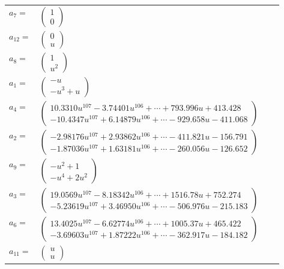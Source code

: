\documentclass[1p]{elsarticle_modified}
\theoremstyle{definition}
\begin{document}
\begin{tabular}{m{7pt} m{180pt} m{7pt} m{180pt} }
\flushright $a_{7}=$&$\begin{pmatrix}1\\0\end{pmatrix}$ \\
\flushright $a_{12}=$&$\begin{pmatrix}0\\u\end{pmatrix}$ \\
\flushright $a_{8}=$&$\begin{pmatrix}1\\u^2\end{pmatrix}$ \\
\flushright $a_{1}=$&$\begin{pmatrix}- u\\- u^3+u\end{pmatrix}$ \\
\flushright $a_{4}=$&$\begin{pmatrix}10.3310 u^{107}-3.74401 u^{106}+\cdots+793.996 u+413.428\\-10.4347 u^{107}+6.14879 u^{106}+\cdots-929.658 u-411.068\end{pmatrix}$ \\
\flushright $a_{2}=$&$\begin{pmatrix}-2.98176 u^{107}+2.93862 u^{106}+\cdots-411.821 u-156.791\\-1.87036 u^{107}+1.63181 u^{106}+\cdots-260.056 u-126.652\end{pmatrix}$ \\
\flushright $a_{9}=$&$\begin{pmatrix}- u^2+1\\- u^4+2 u^2\end{pmatrix}$ \\
\flushright $a_{3}=$&$\begin{pmatrix}19.0569 u^{107}-8.18342 u^{106}+\cdots+1516.78 u+752.274\\-5.23619 u^{107}+3.46950 u^{106}+\cdots-506.976 u-215.183\end{pmatrix}$ \\
\flushright $a_{6}=$&$\begin{pmatrix}13.4025 u^{107}-6.62774 u^{106}+\cdots+1005.37 u+465.422\\-3.69603 u^{107}+1.87222 u^{106}+\cdots-362.917 u-184.182\end{pmatrix}$ \\
\flushright $a_{11}=$&$\begin{pmatrix}u\\u\end{pmatrix}$ \\

\end{tabular}
\end{document}

